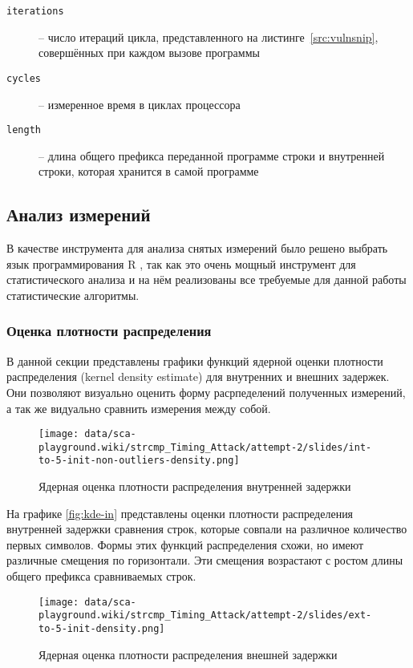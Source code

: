 \begin{description}
\item [\texttt{iterations}] -- число итераций цикла, представленного на
  листинге~\ref{src:vulnsnip}, совершённых при каждом вызове программы 
\item [\texttt{cycles}] -- измеренное время в циклах процессора
\item [\texttt{length}] -- длина общего префикса переданной программе  строки и
  внутренней строки, которая хранится в самой программе
\end{description}

\subsection{Анализ измерений}

В качестве инструмента для анализа снятых измерений было решено выбрать язык программирования
R \cite{r}, так как это очень мощный инструмент для статистического анализа и на нём реализованы
все требуемые для данной работы статистические алгоритмы.

\subsubsection{Оценка плотности распределения}

В данной секции представлены графики функций ядерной оценки плотности
распределения (kernel density estimate) для внутренних и внешних задержек.
Они позволяют визуально оценить форму расрпеделений полученных измерений, а так же
видуально сравнить измерения между собой.

\begin{figure}
    \centering
    \texttt{[image: data/sca-playground.wiki/strcmp\_Timing\_Attack/attempt-2/slides/int-to-5-init-non-outliers-density.png]}
    \caption{Ядерная оценка плотности распределения внутренней задержки}
\end{figure} \label{fig:kde-in}

На графике \ref{fig:kde-in} представлены оценки плотности распределения
внутренней задержки сравнения строк, которые совпали на различное количество
первых символов. Формы этих функций распределения схожи, но имеют различные
смещения по горизонтали. Эти смещения возрастают с ростом длины общего префикса
сравниваемых строк.

\begin{figure}
    \centering
    \texttt{[image: data/sca-playground.wiki/strcmp\_Timing\_Attack/attempt-2/slides/ext-to-5-init-density.png]}
    \caption{Ядерная оценка плотности распределения внешней задержки}
\end{figure} \label{fig:kde-out}

